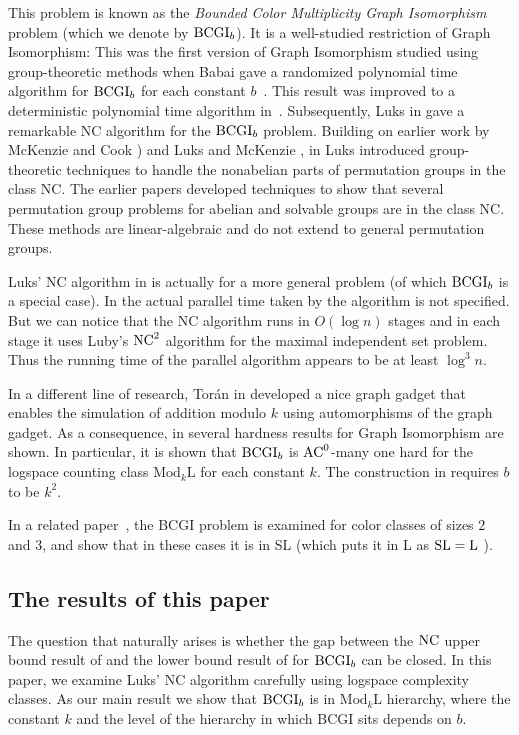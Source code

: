 \documentclass[11pt]{article}
\newcommand{\Mod}[1]{\ensuremath{\mathrm{Mod}_{#1}\mathrm{L}}}
\newcommand{\Lo}{\ensuremath{\mathrm{L}}}
\newcommand{\SL}{\mbox{\rm SL}}
\newcommand{\NC}{\mbox{\rm NC}}
\newcommand{\NCtwo}{\ensuremath{\NC^2}}
\newcommand{\ACzero}{\mbox{\ensuremath{\textrm{AC}^0}}}
\newcommand{\BCGI}{\mbox{\rm BCGI}}
\begin{document}
This problem is known as the \emph{Bounded Color Multiplicity Graph
Isomorphism} problem (which we denote by $\BCGI_b$). It is a
well-studied restriction of Graph Isomorphism: This was the first
version of Graph Isomorphism studied using group-theoretic methods
when Babai gave a randomized polynomial time algorithm for $\BCGI_b$
for each constant $b$~\cite{babai}. This result was improved to a
deterministic polynomial time algorithm in~\cite{FHL}. Subsequently,
Luks in \cite{luks} gave a remarkable NC algorithm for the $\BCGI_b$
problem. Building on earlier work by McKenzie and Cook \cite{MC}) and
Luks and McKenzie \cite{LM}, in \cite{luks} Luks introduced
group-theoretic techniques to handle the nonabelian parts of
permutation groups in the class NC. The earlier papers \cite{MC,LM}
developed techniques to show that several permutation group problems
for abelian and solvable groups are in the class NC. These methods are
linear-algebraic and do not extend to general permutation groups.

Luks' NC algorithm in \cite{luks} is actually for a more general
problem (of which $\BCGI_b$ is a special case). In \cite{luks} the
actual parallel time taken by the algorithm is not specified. But we
can notice that the NC algorithm runs in $O(\log n)$ stages and in
each stage it uses Luby's $\NCtwo$ algorithm for the maximal
independent set problem. Thus the running time of the parallel
algorithm appears to be at least $\log^3 n$.

In a different line of research, Tor\'an in \cite{tor} developed a
nice graph gadget that enables the simulation of addition modulo $k$
using automorphisms of the graph gadget. As a consequence, in
\cite{tor} several hardness results for Graph Isomorphism are
shown. In particular, it is shown that $\BCGI_b$ is $\ACzero$-many one
hard for the logspace counting class $\Mod{k}$ for each constant
$k$. The construction in \cite{tor} requires $b$ to be $k^2$.

In a related paper~\cite{jkmt}, the BCGI problem is examined for color
classes of sizes $2$ and $3$, and show that in these cases it is in SL
(which puts it in L as $\SL=\Lo$ \cite{rein}).

\subsection{The results of this paper}

The question that naturally arises is whether the gap between
the $\NC$ upper bound result of \cite{luks} and the lower bound result
of \cite{tor} for $\BCGI_b$ can be closed. In this paper, we examine
Luks' NC algorithm carefully using logspace complexity classes. As our
main result we show that $\BCGI_b$ is in $\Mod{k}$ hierarchy, where
the constant $k$ and the level of the hierarchy in which BCGI sits
depends on $b$.
\end{document}
